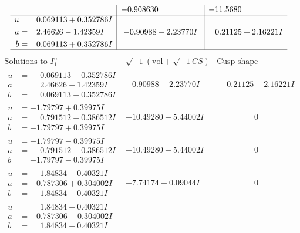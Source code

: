 \documentclass[1p]{elsarticle_modified}
\theoremstyle{definition}
\newcommand{\I}{\sqrt{-1}}
\begin{document}
$$\begin{array}{c|c|c}
 & -0.908630\phantom{ +0.000000I} & -11.5680\phantom{ +0.000000I} \\ \hline\begin{aligned}
u &= \phantom{-}0.069113 + 0.352786 I \\
a &= \phantom{-}2.46626 - 1.42359 I \\
b &= \phantom{-}0.069113 + 0.352786 I\end{aligned}
 & -0.90988 - 2.23770 I & \phantom{-}0.21125 + 2.16221 I\\
 \hline 
 \end{array}$$\newpage$$\begin{array}{c|c|c}  
\text{Solutions to }I^u_{1}& \I (\text{vol} + \sqrt{-1}CS) & \text{Cusp shape}\\
 \hline 
\begin{aligned}
u &= \phantom{-}0.069113 - 0.352786 I \\
a &= \phantom{-}2.46626 + 1.42359 I \\
b &= \phantom{-}0.069113 - 0.352786 I\end{aligned}
 & -0.90988 + 2.23770 I & \phantom{-}0.21125 - 2.16221 I \\ \hline\begin{aligned}
u &= -1.79797 + 0.39975 I \\
a &= \phantom{-}0.791512 + 0.386512 I \\
b &= -1.79797 + 0.39975 I\end{aligned}
 & -10.49280 - 5.44002 I & \phantom{-0.000000 } 0 \\ \hline\begin{aligned}
u &= -1.79797 - 0.39975 I \\
a &= \phantom{-}0.791512 - 0.386512 I \\
b &= -1.79797 - 0.39975 I\end{aligned}
 & -10.49280 + 5.44002 I & \phantom{-0.000000 } 0 \\ \hline\begin{aligned}
u &= \phantom{-}1.84834 + 0.40321 I \\
a &= -0.787306 + 0.304002 I \\
b &= \phantom{-}1.84834 + 0.40321 I\end{aligned}
 & -7.74174 - 0.09044 I & \phantom{-0.000000 } 0 \\ \hline\begin{aligned}
u &= \phantom{-}1.84834 - 0.40321 I \\
a &= -0.787306 - 0.304002 I \\
b &= \phantom{-}1.84834 - 0.40321 I\end{aligned}

\end{array}$$
\end{document}
